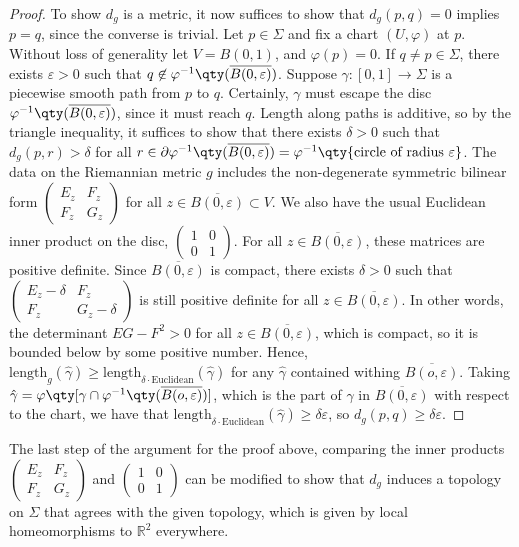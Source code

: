 \begin{proof}
	To show $d_g$ is a metric, it now suffices to show that $d_g(p,q) = 0$ implies $p = q$, since the converse is trivial.
	Let $p \in \Sigma$ and fix a chart $(U,\varphi)$ at $p$.
	Without loss of generality let $V = B(0,1)$, and $\varphi(p) = 0$.
	If $q \neq p \in \Sigma$, there exists $\varepsilon > 0$ such that $q \not\in \varphi^{-1} \qty(\overline{B(0,\varepsilon)})$.
	Suppose $\gamma \colon [0,1] \to \Sigma$ is a piecewise smooth path from $p$ to $q$.
	Certainly, $\gamma$ must escape the disc $\varphi^{-1} \qty(\overline{B(0,\varepsilon)})$, since it must reach $q$.
	Length along paths is additive, so by the triangle inequality, it suffices to show that there exists $\delta > 0$ such that $d_g(p,r) > \delta$ for all $r \in \partial \varphi^{-1} \qty(\overline{B(0,\varepsilon)}) = \varphi^{-1} \qty{ \text{circle of radius } \varepsilon }$.
	The data on the Riemannian metric $g$ includes the non-degenerate symmetric bilinear form $\begin{pmatrix}
		E_z & F_z \\
		F_z & G_z
	\end{pmatrix}$ for all $z \in \overline{B(0,\varepsilon)} \subset V$.
	We also have the usual Euclidean inner product on the disc, $\begin{pmatrix}
		1 & 0 \\
		0 & 1
	\end{pmatrix}$.
	For all $z \in \overline{B(0,\varepsilon)}$, these matrices are positive definite.
	Since $\overline{B(0,\varepsilon)}$ is compact, there exists $\delta > 0$ such that
	$\begin{pmatrix}
		E_z - \delta & F_z          \\
		F_z          & G_z - \delta
	\end{pmatrix}$
	is still positive definite for all $z \in \overline{B(0,\varepsilon)}$.
	In other words, the determinant $EG-F^2 > 0$ for all $z \in \overline{B(0,\varepsilon)}$, which is compact, so it is bounded below by some positive number.
	Hence, $\mathrm{length}_g(\hat\gamma) \geq \mathrm{length}_{\delta \cdot \mathrm{Euclidean}}(\hat \gamma)$ for any $\hat \gamma$ contained withing $\overline{B(o,\varepsilon)}$.
	Taking $\hat\gamma = \varphi \qty[ \gamma \cap \varphi^{-1}\qty(\overline{B(o,\varepsilon)}) ]$, which is the part of $\gamma$ in $\overline{B(0,\varepsilon)}$ with respect to the chart, we have that $\mathrm{length}_{\delta \cdot \mathrm{Euclidean}}(\hat \gamma) \geq \delta \varepsilon$, so $d_g(p,q) \geq \delta\varepsilon$.
\end{proof}
\begin{remark}
	The last step of the argument for the proof above, comparing the inner products $\begin{pmatrix}
		E_z & F_z \\
		F_z & G_z
	\end{pmatrix}$ and $\begin{pmatrix}
		1 & 0 \\
		0 & 1
	\end{pmatrix}$ can be modified to show that $d_g$ induces a topology on $\Sigma$ that agrees with the given topology, which is given by local homeomorphisms to $\mathbb R^2$ everywhere.
\end{remark}

